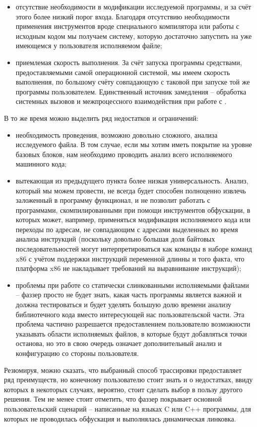 \begin{itemize}
	\item отсутствие необходимости в модификации исследуемой программы, и за счёт этого более низкий порог входа. Благодаря отсутствию необходимости применения инструментов вроде специального компилятора или работы с исходным кодом мы получаем систему, которую достаточно запустить на уже имеющемся у пользователя исполняемом файле;
	
	\item приемлемая скорость выполнения. За счёт запуска программы средствами, предоставляемыми самой операционной системой, мы имеем скорость выполнения, по большому счёту совпадающую с таковой при запуске той же программы пользователем. Единственный источник замедления -- обработка системных вызовов и межпроцессного взаимодействия при работе с .
\end{itemize}

В то же время можно выделить ряд недостатков и ограничений:

\begin{itemize}
	\item необходимость проведения, возможно довольно сложного, анализа исследуемого файла. В том случае, если мы хотим иметь покрытие на уровне базовых блоков, нам необходимо проводить анализ всего исполняемого машинного кода;
	
	\item вытекающая из предыдущего пункта более низкая универсальность. Анализ, который мы можем провести, не всегда будет способен полноценно извлечь заложенный в программу функционал, и не позволит работать с программами, скомпилированными при помощи инструментов обфускации, в которых может, например, применяться модификация исполняемого кода или переходы по адресам, не совпадающим с адресами выделенных во время анализа инструкций (поскольку довольно большая доля байтовых последовательностей могут интерпретироваться как команды в наборе команд x86 с учётом поддержки инструкций переменной длинны и того факта, что платформа x86 не накладывает требований на выравнивание инструкций);
	
	\item проблемы при работе со статически слинкованными исполняемыми файлами -- фаззер просто не будет знать, какая часть программы является важной и должна тестироваться и будет уделять большую долю времени анализу библиотечного кода вместо интересующей нас пользовательской части. Эта проблема частично разрешается предоставлением пользователю возможности указывать области исполняемых файлов, в которые будут добавляться точки останова, но это в свою очередь означает дополнительный анализ и конфигурацию со стороны пользователя.
\end{itemize}

Резюмируя, можно сказать, что выбранный способ трассировки предоставляет ряд преимуществ, но конечному пользователю стоит знать и о недостатках, ввиду которых в некоторых случаях, вероятно, стоит сделать выбор в пользу другого решения. Тем не менее стоит отметить, что фаззер покрывает основной пользовательский сценарий -- написанные на языках C или C++ программы, для которых не проводилась обфускация и выполнялась динамическая линковка.